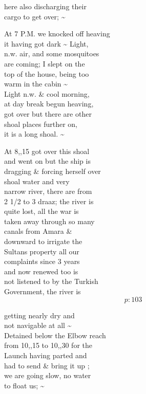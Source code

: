 \documentclass{report}
\begin{document}

	\par{
 	here also discharging their\ \\cargo to get over; \~{}\ \\
	}

	\par{
 	At 7 P.M. we knocked off heaving\ \\it having got dark \~{} Light,\ \\n.w. air, and some mosquitoes\ \\are coming; I slept on the\ \\top of the house, being too\ \\warm in the cabin \~{}\ \\Light n.w. \& cool morning,\ \\at day break begun heaving,\ \\got over but there are other\ \\shoal places further on,\ \\it is a long shoal. \~{}\ \\
	}

	\par{
 	At 8,,15 got over this shoal\ \\and went on but the ship is\ \\dragging \& forcing herself over\ \\shoal water and very\ \\narrow river, there are from\ \\2 1/2 to 3 draaz; the river is\ \\quite lost, all the war is\ \\taken away through so many\ \\canals from Amara \&\ \\downward to irrigate the\ \\Sultans property all our\ \\complaints since 3 years\ \\and now renewed too is\ \\not listened to by the Turkish\ \\Government, the river is\ \\
  \[p: 103 \]

	}


	\par{
 	getting nearly dry and\ \\not navigable at all \~{}\ \\Detained below the Elbow reach\ \\from 10,,15 to 10,,30 for the\ \\Launch having parted and\ \\had to send \& bring it up ;\ \\we are going slow, no water\ \\to float us; \~{}\ \\
	}
\end{document}
